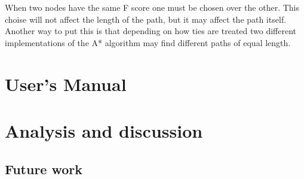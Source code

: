 \documentclass[12pt, a4paper]{article}
\begin{document}
When two nodes have the same F score one must be chosen over the other. This
choise will not affect the length of the path, but it may affect the path
itself. Another way to put this is that depending on how ties are treated two
different implementations of the A* algorithm may find different paths of equal
length. \cite{astar2}


\section{User's Manual}





\section{Analysis and discussion}
\label{Analysis}





\subsection{Future work}








\pagebreak


\end{document}
